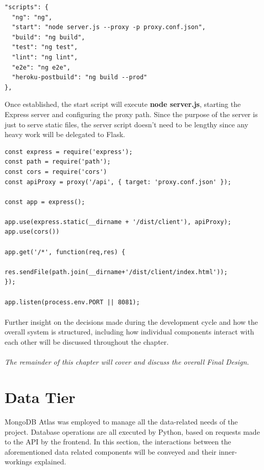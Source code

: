 \begin{lstlisting}[caption=Proxy Reference]
"scripts": {
  "ng": "ng",
  "start": "node server.js --proxy -p proxy.conf.json",
  "build": "ng build",
  "test": "ng test",
  "lint": "ng lint",
  "e2e": "ng e2e",
  "heroku-postbuild": "ng build --prod"
},
\end{lstlisting}

Once established, the start script will execute \textbf{node server.js}, starting the Express server and configuring the proxy path. Since the purpose of the server is just to serve static files, the server script doesn't need to be lengthy since any heavy work will be delegated to Flask. \newline

\begin{lstlisting}[caption=Express Server Runner]
const express = require('express');
const path = require('path');
const cors = require('cors')
const apiProxy = proxy('/api', { target: 'proxy.conf.json' });

const app = express();

app.use(express.static(__dirname + '/dist/client'), apiProxy);
app.use(cors())

app.get('/*', function(req,res) {

res.sendFile(path.join(__dirname+'/dist/client/index.html'));
});

app.listen(process.env.PORT || 8081);
\end{lstlisting}

\paragraph{}
Further insight on the decisions made during the development cycle and how the overall system is structured, including how individual components interact with each other will be discussed throughout the chapter.

\paragraph{}
\textit{The remainder of this chapter will cover and discuss the overall Final Design.}


\section{Data Tier}
MongoDB Atlas was employed to manage all the data-related needs of the project. Database operations are all executed by Python, based on requests made to the API by the frontend. In this section, the interactions between the aforementioned data related components will be conveyed and their inner-workings explained.

